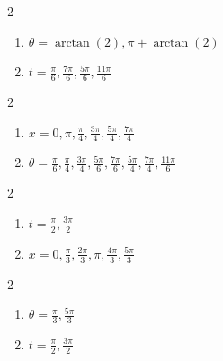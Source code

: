 \documentclass{ximera}
\begin{document}
\begin{multicols}{2}

\begin{enumerate}

\setcounter{enumi}{\value{HW}}

\item  $\theta=\arctan(2), \pi + \arctan(2)$ 
\item  $t = \frac{\pi}{6}, \frac{7\pi}{6}, \frac{5\pi}{6}, \frac{11\pi}{6}$

\setcounter{HW}{\value{enumi}}

\end{enumerate}

\end{multicols}

\begin{multicols}{2}

\begin{enumerate}

\setcounter{enumi}{\value{HW}}

\item  $x = 0, \pi, \frac{\pi}{4}, \frac{3\pi}{4}, \frac{5\pi}{4}, \frac{7\pi}{4}$
\item  $\theta = \frac{\pi}{6}, \frac{\pi}{4}, \frac{3\pi}{4}, \frac{5\pi}{6}, \frac{7\pi}{6}, \frac{5\pi}{4}, \frac{7\pi}{4}, \frac{11\pi}{6}$

\setcounter{HW}{\value{enumi}}

\end{enumerate}

\end{multicols}

\begin{multicols}{2}

\begin{enumerate}

\setcounter{enumi}{\value{HW}}

\item  $t = \frac{\pi}{2}, \frac{3\pi}{2}$
\item $x = 0, \frac{\pi}{3}, \frac{2\pi}{3}, \pi, \frac{4\pi}{3}, \frac{5\pi}{3}$

\setcounter{HW}{\value{enumi}}

\end{enumerate}

\end{multicols}

\begin{multicols}{2}

\begin{enumerate}

\setcounter{enumi}{\value{HW}}

\item $\theta  = \frac{\pi}{3}, \frac{5\pi}{3}$
\item $t = \frac{\pi}{2}, \frac{3\pi}{2}$

\setcounter{HW}{\value{enumi}}

\end{enumerate}

\end{multicols}
\end{document}
